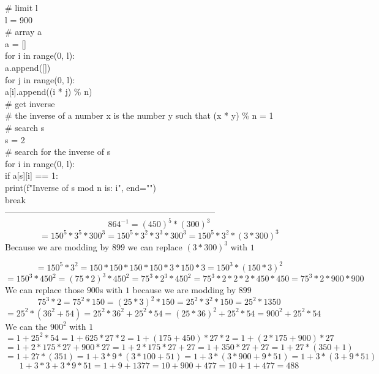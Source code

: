 \documentclass[10pt, AMS Euler]{article}
\begin{document}
\begin{enumerate}
            \# limit l \\
            l = 900 \\
            
            \# array a \\
            a = [] \\
            
            for i in range(0, l): \\
                a.append([]) \\
                for j in range(0, l): \\
                    a[i].append((i * j) \% n) \\
            
            \# get inverse \\
            \# the inverse of a number x is the number y such that (x * y) \% n = 1 \\
            
            \# search s \\
            s = 2 \\
            
           \# search for the inverse of s \\
            for i in range(0, l): \\
                if a[s][i] == 1: \\
                    print(f"Inverse of {s} mod {n} is: {i}", end="") \\
                    break \\
-------------------------------------------------------------------------- \\
        
        $$ 864^{-1} = (450)^5 * (300)^3 $$
        $$ = 150^5 * 3^5 * 300^3 = 150^5 * 3^2 * 3^3 * 300^3 = 150^5 * 3^2 * (3 * 300)^3 $$
        Because we are modding by $899$ we can replace $(3 * 300)^3$ with $1$

        $$ = 150^5 * 3^2 = 150 * 150 * 150 * 150 * 3 * 150 * 3 = 150^3 * (150*3)^2 $$
        $$ = 150^3 * 450^2 = (75 * 2)^3 * 450^2 = 75^3 * 2^3 * 450^2 = 75^3 * 2*2*2 * 450*450 = 75^3 * 2 *900*900 $$
        We can replace those $900$s with $1$ because we are modding by $899$
        $$ 75^3 * 2 = 75^2 * 150 = (25 * 3)^2 * 150 = 25^2 * 3^2 * 150 = 25^2 * 1350 $$
        $$ = 25^2 * (36^2 + 54) = 25^2 * 36^2 + 25^2 * 54 = (25*36)^2 + 25^2 * 54 = 900^2 + 25^2 * 54 $$
        We can the $900^2$ with $1$
        $$ = 1 + 25^2 * 54 = 1 + 625 * 27 * 2 = 1 + (175 + 450) * 27 * 2 = 1 + (2*175 + 900) * 27 $$
        $$ = 1 + 2*175*27 + 900 * 27 = 1 + 2 * 175 * 27 + 27 = 1 + 350 * 27 + 27 = 1 + 27 * (350 + 1) $$
        $$ = 1 + 27 * (351) = 1 + 3 * 9 * (3 * 100 + 51) = 1 + 3 * (3 * 900 + 9 * 51) = 1 + 3 * (3 + 9 * 51) $$
        $$ 1 + 3 * 3 + 3 * 9 * 51 = 1 + 9 + 1377 = 10 + 900 + 477 = 10 + 1 + 477 = 488 $$


\end{enumerate}
\end{document}
